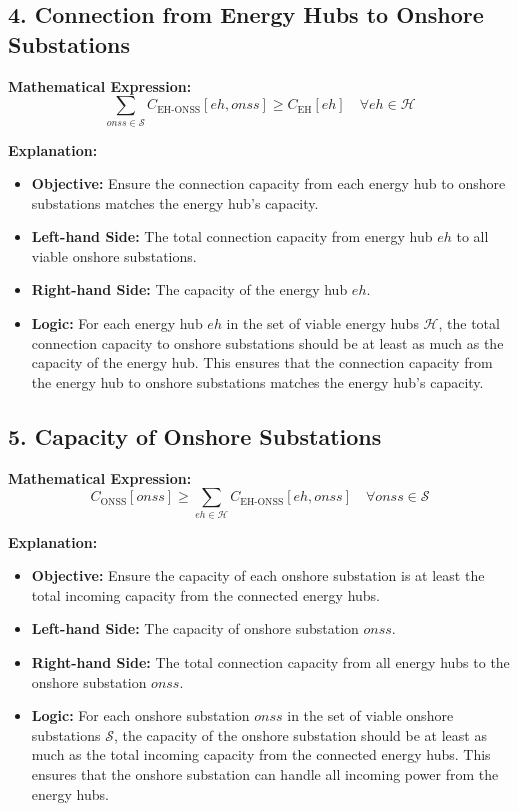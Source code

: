 \subsection*{4. Connection from Energy Hubs to Onshore Substations}

\textbf{Mathematical Expression:}
\[
\sum_{onss \in \mathcal{S}} C_{\text{EH-ONSS}}[eh, onss] \geq C_{\text{EH}}[eh] \quad \forall eh \in \mathcal{H}
\]

\textbf{Explanation:}
\begin{itemize}
    \item \textbf{Objective:} Ensure the connection capacity from each energy hub to onshore substations matches the energy hub's capacity.
    \item \textbf{Left-hand Side:} The total connection capacity from energy hub \( eh \) to all viable onshore substations.
    \item \textbf{Right-hand Side:} The capacity of the energy hub \( eh \).
    \item \textbf{Logic:} For each energy hub \( eh \) in the set of viable energy hubs \( \mathcal{H} \), the total connection capacity to onshore substations should be at least as much as the capacity of the energy hub. This ensures that the connection capacity from the energy hub to onshore substations matches the energy hub's capacity.
\end{itemize}

\subsection*{5. Capacity of Onshore Substations}

\textbf{Mathematical Expression:}
\[
C_{\text{ONSS}}[onss] \geq \sum_{eh \in \mathcal{H}} C_{\text{EH-ONSS}}[eh, onss] \quad \forall onss \in \mathcal{S}
\]

\textbf{Explanation:}
\begin{itemize}
    \item \textbf{Objective:} Ensure the capacity of each onshore substation is at least the total incoming capacity from the connected energy hubs.
    \item \textbf{Left-hand Side:} The capacity of onshore substation \( onss \).
    \item \textbf{Right-hand Side:} The total connection capacity from all energy hubs to the onshore substation \( onss \).
    \item \textbf{Logic:} For each onshore substation \( onss \) in the set of viable onshore substations \( \mathcal{S} \), the capacity of the onshore substation should be at least as much as the total incoming capacity from the connected energy hubs. This ensures that the onshore substation can handle all incoming power from the energy hubs.
\end{itemize}

